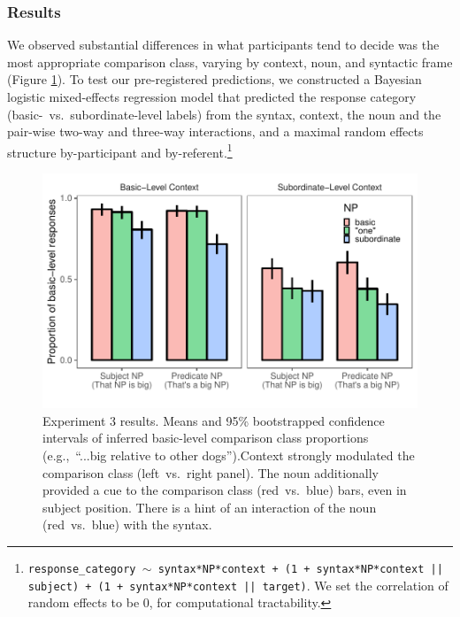 \documentclass[10pt,letterpaper]{article}
\begin{document}
\subsubsection{Results} We observed substantial differences in what participants tend to decide was the most appropriate comparison class, varying by context, noun, and syntactic frame (Figure \ref{cc-inference}). To test our pre-registered predictions, we constructed a Bayesian logistic mixed-effects regression model that predicted the response category (basic-~vs.~subordinate-level labels) from the syntax, context, the noun and the pair-wise two-way and three-way interactions, and a maximal random effects structure by-participant and by-referent.\footnote{ \texttt{response\_category $\sim$ syntax*NP*context + (1 + syntax*NP*context || subject) + (1 + syntax*NP*context || target)}. We set the correlation of random effects to be 0, for computational tractability.}
\begin{figure}[t]
\begin{center}
\includegraphics[width=\linewidth]{expt-cci-prereg-bars.pdf}
\end{center}
\vspace{-0.5cm}
\caption{Experiment 3 results. Means and 95\% bootstrapped confidence intervals of inferred basic-level comparison class proportions (e.g.,~“...big relative to other dogs”).Context strongly modulated the comparison class (left~vs.~right panel). The noun additionally provided a cue to the comparison class (red~vs.~blue) bars, even in subject position. There is a hint of an interaction of the noun (red~vs.~blue) with the syntax. 
}
\vspace{-0.3cm}
\label{cc-inference}
\end{figure}
\end{document}
